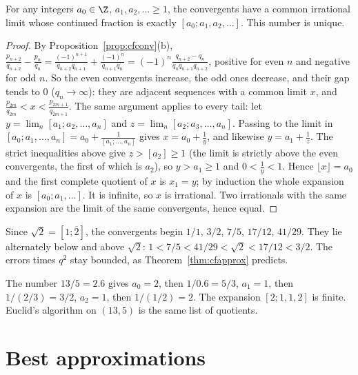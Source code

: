 \begin{lemma}\label{lem:cfexistence}
For any integers $a_0\in\Z$, $a_1,a_2,\ldots\ge1$, the convergents
have a common irrational limit whose continued fraction is exactly
$[a_0;a_1,a_2,\ldots]$. This number is unique.
\end{lemma}
\begin{proof}
By Proposition~\ref{prop:cfconv}(b), $\frac{p_{n+2}}{q_{n+2}}-\frac{p_n}{q_n}=\frac{(-1)^{n+1}}{q_{n+2}q_{n+1}}+\frac{(-1)^n}{q_{n+1}q_n}=(-1)^n\frac{q_{n+2}-q_n}{q_nq_{n+1}q_{n+2}}$, positive for even $n$ and negative for odd $n$. So the even convergents increase, the odd ones decrease, and their gap tends to $0$ ($q_n\to\infty$): they are adjacent sequences with a common limit $x$, and $\frac{p_{2m}}{q_{2m}}<x<\frac{p_{2m+1}}{q_{2m+1}}$. The same argument applies to every tail: let $y=\lim_n[a_1;a_2,\dots,a_n]$ and $z=\lim_n[a_2;a_3,\dots,a_n]$. Passing to the limit in $[a_0;a_1,\dots,a_n]=a_0+\frac1{[a_1;\dots,a_n]}$ gives $x=a_0+\frac1y$, and likewise $y=a_1+\frac1z$. The strict inequalities above give $z>[a_2]\ge1$ (the limit is strictly above the even convergents, the first of which is $a_2$), so $y>a_1\ge1$ and $0<\frac1y<1$. Hence $\lfloor x\rfloor=a_0$ and the first complete quotient of $x$ is $x_1=y$; by induction the whole expansion of $x$ is $[a_0;a_1,\dots]$. It is infinite, so $x$ is irrational. Two irrationals with the same expansion are the limit of the same convergents, hence equal.
\end{proof}

\begin{examplex}
Since $\sqrt 2=[1;\overline{2}]$, the convergents begin $1/1$, $3/2$, $7/5$, $17/12$, $41/29$. They lie alternately below and above $\sqrt 2$: $1<7/5<41/29<\sqrt 2<17/12<3/2$. The errors times $q^2$ stay bounded, as Theorem~\ref{thm:cfapprox} predicts.
\end{examplex}

\begin{examplex}
The number $13/5=2.6$ gives $a_0=2$, then $1/0.6=5/3$, $a_1=1$, then $1/(2/3)=3/2$, $a_2=1$, then $1/(1/2)=2$. The expansion $[2;1,1,2]$ is finite. Euclid's algorithm on $(13,5)$ is the same list of quotients.
\end{examplex}

\section{Best approximations}


